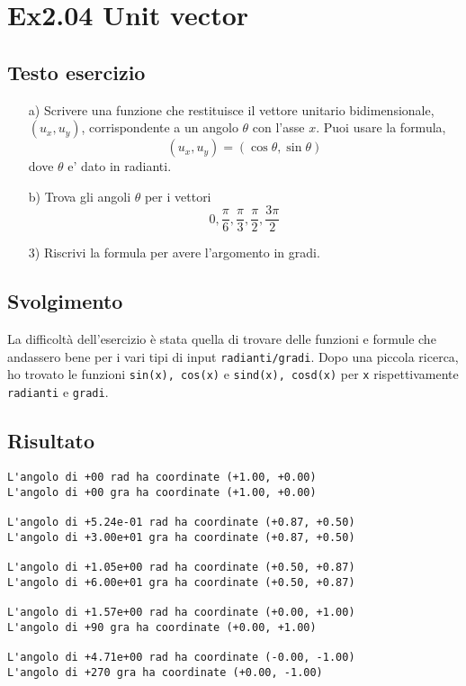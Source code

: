 \section{Ex2.04 Unit vector}\label{sec:Unit_vector}

\subsection{Testo esercizio}
\begin{itemize}
    \item[a)] Scrivere una funzione che restituisce il vettore unitario 
    bidimensionale, $(u_x , u_y)$, corrispondente a un angolo $\theta$ con 
    l'asse $x$. Puoi usare la formula, $$(u_x , u_y)=(\cos\theta,\sin\theta)$$ 
    dove $\theta$ e' dato in radianti.
    
    \item[b)] Trova gli angoli $\theta$ per i vettori 
    $$0,\frac{\pi}{6},\frac{\pi}{3},\frac{\pi}{2},\frac{3\pi}{2}$$     
    
    \item[3)] Riscrivi la formula per avere l'argomento in gradi.
\end{itemize}

\subsection{Svolgimento}
La difficoltà dell'esercizio è stata quella di trovare delle funzioni e formule 
che andassero bene per i vari tipi di input \verb|radianti/gradi|. Dopo una 
piccola ricerca, ho trovato le funzioni \MATLAB \verb|sin(x), cos(x)| e 
\verb|sind(x), cosd(x)| per \verb|x| rispettivamente \verb|radianti| e 
\verb|gradi|.

\subsection{Risultato}
\color{gray}
\begin{verbatim}
L'angolo di +00 rad ha coordinate (+1.00, +0.00)
L'angolo di +00 gra ha coordinate (+1.00, +0.00)

L'angolo di +5.24e-01 rad ha coordinate (+0.87, +0.50)
L'angolo di +3.00e+01 gra ha coordinate (+0.87, +0.50)

L'angolo di +1.05e+00 rad ha coordinate (+0.50, +0.87)
L'angolo di +6.00e+01 gra ha coordinate (+0.50, +0.87)

L'angolo di +1.57e+00 rad ha coordinate (+0.00, +1.00)
L'angolo di +90 gra ha coordinate (+0.00, +1.00)

L'angolo di +4.71e+00 rad ha coordinate (-0.00, -1.00)
L'angolo di +270 gra ha coordinate (+0.00, -1.00)
\end{verbatim}
\color{black}
